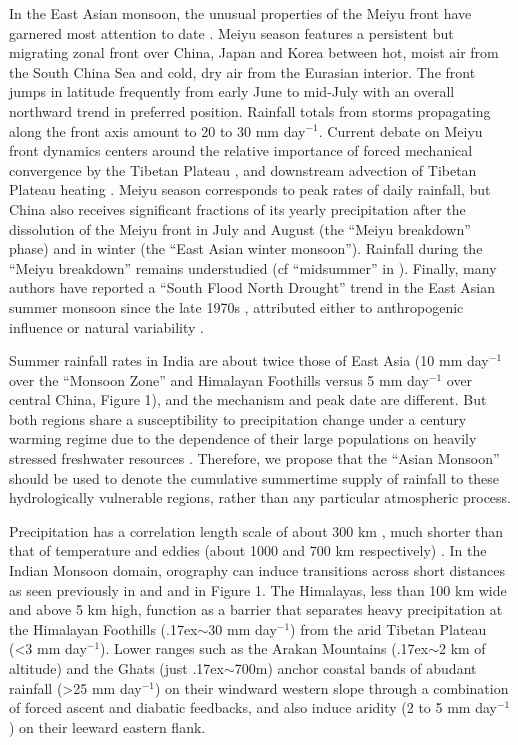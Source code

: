 \documentclass[12pt]{article}
\newcommand{\mytilde}{\raise.17ex\hbox{$\scriptstyle\mathtt{\sim}$}}	%
\begin{document}
	In the East Asian monsoon, the unusual properties of the Meiyu front have garnered most attention to date \citep{Ding2005}. Meiyu season features a persistent but migrating zonal front over China, Japan and Korea between hot, moist air from the South China Sea and cold, dry air from the Eurasian interior. The front jumps in latitude frequently from early June to mid-July with an overall northward trend in preferred position. Rainfall totals from storms propagating along the front axis amount to 20 to 30 mm day$^{-1}$. Current debate on Meiyu front dynamics centers around the relative importance of forced mechanical convergence by the Tibetan Plateau \citep{Molnar2010,Chen2014}, and downstream advection of Tibetan Plateau heating \citep{Sampe2010}. Meiyu season corresponds to peak rates of daily rainfall, but China also receives significant fractions of its yearly precipitation after the dissolution of the Meiyu front in July and August (the ``Meiyu breakdown'' phase) and in winter (the ``East Asian winter monsoon''). Rainfall during the ``Meiyu breakdown'' remains understudied (cf ``midsummer'' in \cite{Kosaka2011}). Finally, many authors have reported a ``South Flood North Drought'' trend in the East Asian summer monsoon since the late 1970s \citep{Gong2002,Ding2008}, attributed either to anthropogenic influence or natural variability \citep{Song2014,Lei2014}.
	
	Summer rainfall rates in India are about twice those of East Asia (10 mm day$^{-1}$ over the ``Monsoon Zone'' and Himalayan Foothills versus 5 mm day$^{-1}$ over central China, Figure 1), and the mechanism and peak date are different. But both regions share a susceptibility to precipitation change under a  century warming regime due to the dependence of their large populations on heavily stressed freshwater resources \citep{Gleeson2012}. Therefore, we propose that the ``Asian Monsoon'' should be used to denote the cumulative summertime supply of rainfall to these hydrologically vulnerable regions, rather than any particular atmospheric process.
	
	Precipitation has a correlation length scale of about 300 km \citep{Dai1997}, much shorter than that of temperature and eddies (about 1000 and 700 km respectively) \citep{Hansen1987,Barnes2012}. In the Indian Monsoon domain, orography can induce transitions across short distances as seen previously in \cite{Xie2006} and \cite{Biasutti2012} and in Figure 1. The Himalayas, less than 100 km wide and above 5 km high, function as a barrier that separates heavy precipitation at the Himalayan Foothills (\mytilde30 mm day$^{-1}$) from the arid Tibetan Plateau (\textless 3 mm day$^{-1}$). Lower ranges such as the Arakan Mountains (\mytilde2 km of altitude) and the Ghats (just \mytilde700m) anchor coastal bands of abudant rainfall (\textgreater25 mm day$^{-1}$) on their windward western slope through a combination of forced ascent and diabatic feedbacks, and also induce aridity (2 to 5 mm day$^{-1}$) on their leeward eastern flank. 
	
\end{document}
